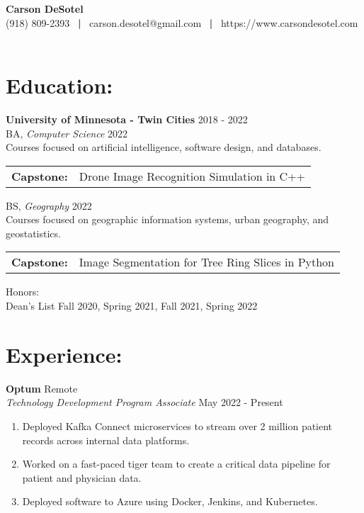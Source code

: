 \documentclass[10pt]{article}
\begin{document}
	\begin{center}
		{\LARGE \textbf{Carson DeSotel}} \\
		\vspace{5pt} 		%
		(918) 809-2393 \ \textbf{|} \
		carson.desotel@gmail.com \ \textbf{|} \
		https://www.carsondesotel.com \
		
	\end{center}
		
	\section*{Education: \hrulefill} 
		\textbf{University of Minnesota - Twin Cities} \hfill 2018 - 2022 \\
		\indent BA, \textit{Computer Science} \hfill 2022 \\
		\indent \indent Courses focused on artificial intelligence, software design, and databases. \\
		\indent \indent
		\begin{tabular}{@{}l@{\ }l}
		\textbf{Capstone: } & Drone Image Recognition Simulation in C++ \\
		\end{tabular}
		\vspace{5pt}
		
		\indent BS, \textit{Geography} \hfill 2022 \\
		\indent \indent Courses focused on geographic information systems, urban geography, and geostatistics. \\		
		\indent \indent
		\begin{tabular}{@{}l@{\ }l}
		\textbf{Capstone: } & Image Segmentation for Tree Ring Slices in Python\\
		\end{tabular}
		
		\vspace{5pt}
		\indent 
		{Honors: }\\
		\indent \indent
		{Dean's List} \hfill Fall 2020, Spring 2021, Fall 2021, Spring 2022
			
	\section*{Experience: \hrulefill}
		\noindent
		\textbf{Optum} \hfill Remote \\
		\textit{Technology Development Program Associate} \hfill May 2022 - Present
		\begin{enumerate}[label=--]
			\item Deployed Kafka Connect microservices to stream over 2 million patient records across internal data platforms. 
			\item Worked on a fast-paced tiger team to create a critical data pipeline for patient and physician data. 
			\item Deployed software to Azure using Docker, Jenkins, and Kubernetes.
		\end{enumerate}
		
\end{document}
